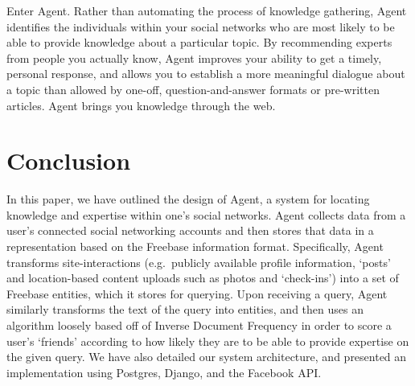 \documentclass[11pt]{article}
\begin{document}
Enter Agent. Rather than automating the process of knowledge gathering, Agent
identifies the individuals within your social networks who are most likely to be
able to provide knowledge about a particular topic. By recommending experts
from people you actually know, Agent improves your ability to get a timely,
personal response, and allows you to establish a more meaningful dialogue about
a topic than allowed by one-off, question-and-answer formats or pre-written
articles. Agent brings you knowledge through the web.






\section{Conclusion}
\label{sec:conclusion}
In this paper, we have outlined the design of Agent, a system for locating
knowledge and expertise within one's social networks. Agent collects data from a
user's connected social networking accounts and then stores that data in a
representation based on the Freebase information format. Specifically, Agent
transforms site-interactions (e.g.\ publicly available profile information,
`posts' and location-based content uploads such as photos and `check-ins') into
a set of Freebase entities, which it stores for querying. Upon receiving a
query, Agent similarly transforms the text of the query into entities, and then
uses an algorithm loosely based off of Inverse Document Frequency in order to
score a user's `friends' according to how likely they are to be able to provide
expertise on the given query. We have also detailed our system architecture, and
presented an implementation using Postgres, Django, and the Facebook API.



\end{document}
